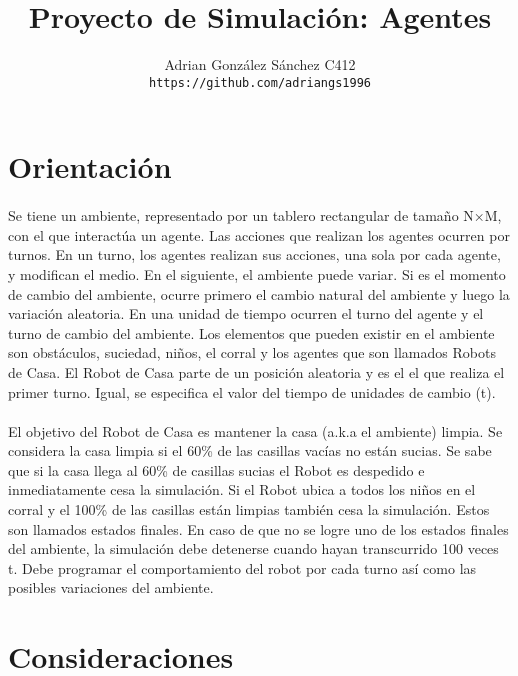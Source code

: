 \documentclass[a4paper, 12pt]{article}
\begin{document}
\title{Proyecto de Simulaci\'on: Agentes}
\author{
   Adrian Gonz\'alez S\'anchez C412\\
   \texttt{https://github.com/adriangs1996}
}
\maketitle
\section*{Orientaci\'on}
\paragraph{}
Se tiene un ambiente, representado por un tablero rectangular de tamaño
N×M, con el que interact\'ua un agente. Las acciones que realizan los agentes
ocurren por turnos. En un turno, los agentes realizan sus acciones, una sola
por cada agente, y modifican el medio. En el siguiente, el ambiente puede
variar. Si es el momento de cambio del ambiente, ocurre primero el cambio
natural del ambiente y luego la variaci\'on aleatoria. En una unidad de tiempo
ocurren el turno del agente y el turno de cambio del ambiente. Los elementos
que pueden existir en el ambiente son obst\'aculos, suciedad, niños, el corral y
los agentes que son llamados Robots de Casa. El Robot de Casa parte de un
posici\'on aleatoria y es el el que realiza el primer turno. Igual, se especifica
el valor del tiempo de unidades de cambio (t).

\paragraph{}
El objetivo del Robot de Casa es mantener la casa (a.k.a el ambiente)
limpia. Se considera la casa limpia si el 60\% de las casillas vac\'ias no est\'an
sucias. Se sabe que si la casa llega al 60\% de casillas sucias el Robot es
despedido e inmediatamente cesa la simulación. Si el Robot ubica a todos
los niños en el corral y el 100\% de las casillas est\'an limpias tambi\'en cesa
la simulaci\'on. Estos son llamados estados finales. En caso de que no se
logre uno de los estados finales del ambiente, la simulación debe detenerse
cuando hayan transcurrido 100 veces t. Debe programar el comportamiento
del robot por cada turno as\'i como las posibles variaciones del ambiente.

\section*{Consideraciones}
\end{document}
